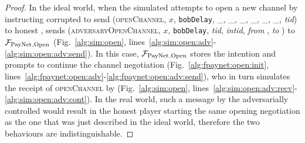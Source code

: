 \begin{proof}
  In the ideal world, when the simulated \adversary{} attempts to open a
  new channel by instructing corrupted \alice{} to send (\textsc{openChannel},
  $x$, \texttt{bobDelay}, \_, \_, \_, \_, \_, \_, \textit{tid}) to honest \bob,
  \simulator{} sends (\textsc{adversaryOpenChannel}, $x$, \texttt{bobDelay},
  \textit{tid}, \textit{intid}, \textit{from} \alice, \textit{to} \bob) to
  $\mathcal{F}_{\mathrm{PayNet}}{}_{\mathrm{, Open}}$  (Fig.~\ref{alg:sim:open},
  lines~\ref{alg:sim:open:adv}-\ref{alg:sim:open:adv:send}). In this case,
  $\mathcal{F}_{\mathrm{PayNet}}{}_{\mathrm{, Open}}$ stores the intention and prompts \simulator{}
  to continue the channel negotiation (Fig.~\ref{alg:fpaynet:open:init},
  lines~\ref{alg:fpaynet:open:adv}-\ref{alg:fpaynet:open:adv:send}), who in turn
  simulates the receipt of \textsc{openChannel} by \bob{}
  (Fig.~\ref{alg:sim:open},
  lines~\ref{alg:sim:open:adv:recv}-\ref{alg:sim:open:adv:cont}). In the real
  world, such a message by the adversarially controlled \alice{} would result in
  the honest player \bob{} starting the same opening negotiation as the one that
  was just described in the ideal world, therefore the two behaviours are
  indistinguishable.


\end{proof}
